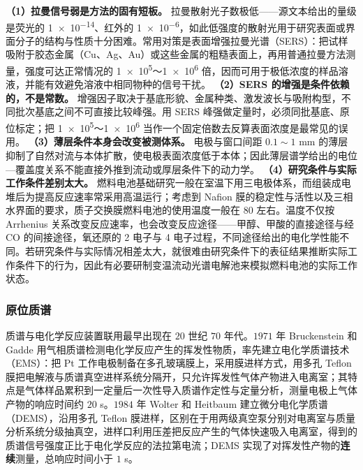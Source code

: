 \begin{pitfall}
 \textbf{（1）拉曼信号弱是方法的固有短板。} 拉曼散射光子数极低——源文本给出的量级是荧光的 \num{1e-14}、红外的 \num{1e-6}，如此低强度的散射光用于研究表面或界面分子的结构与性质十分困难。常用对策是表面增强拉曼光谱（SERS）：把试样吸附于胶态金属（Cu、Ag、Au）或这些金属的粗糙表面上，再用普通拉曼方法测量，强度可达正常情况的 \num{1e5}～\num{1e6} 倍，因而可用于极低浓度的样品溶液，并能有效避免溶液中相同物种的信号干扰。
 \textbf{（2）SERS 的增强是条件依赖的，不是常数。} 增强因子取决于基底形貌、金属种类、激发波长与吸附构型，不同批次基底之间不可直接比较峰强。用 SERS 峰强做定量时，必须同批基底、原位标定；把 \num{1e5}～\num{1e6} 当作一个固定倍数去反算表面浓度是最常见的误用。
 \textbf{（3）薄层条件本身会改变被测体系。} 电极与窗口间距 $0.1\sim1$ mm 的薄层抑制了自然对流与本体扩散，使电极表面浓度低于本体；因此薄层谱学给出的电位—覆盖度关系不能直接外推到流动或厚层条件下的动力学。
 \textbf{（4）研究条件与实际工作条件差别太大。} 燃料电池基础研究一般在室温下用三电极体系，而组装成电堆后为提高反应速率常采用高温运行；考虑到 Nafion 膜的稳定性与活性以及三相水界面的要求，质子交换膜燃料电池的使用温度一般在 $80$ \degC 左右。温度不仅按 Arrhenius 关系改变反应速率，也会改变反应途径——甲醇、甲酸的直接途径与经 CO 的间接途径，氧还原的 2 电子与 4 电子过程，不同途径给出的电化学性能不同。若研究条件与实际情况相差太大，就很难由研究条件下的表征结果推断实际工作条件下的行为，因此有必要研制变温流动光谱电解池来模拟燃料电池的实际工作状态。
\end{pitfall}

\subsubsection{原位质谱}

质谱与电化学反应装置联用最早出现在 $20$ 世纪 $70$ 年代。$1971$ 年 Bruckenstein 和 Gadde 用气相质谱检测电化学反应产生的挥发性物质，率先建立电化学质谱技术（EMS）：把 Pt 工作电极制备在多孔玻璃膜上，采用膜进样方式，用多孔 Teflon 膜把电解液与质谱真空进样系统分隔开，只允许挥发性气体产物进入电离室；其特点是气体样品累积到一定量后一次性导入质谱作定性与定量分析，测量电极上气体产物的响应时间约 $20$ s。$1984$ 年 Wolter 和 Heitbaum 建立微分电化学质谱（DEMS），沿用多孔 Teflon 膜进样，区别在于用两级真空泵分别对电离室与质量分析系统分级抽真空，进样口利用压差把反应产生的气体快速吸入电离室，得到的质谱信号强度正比于电化学反应的法拉第电流；DEMS 实现了对挥发性产物的\textbf{连续}测量，总响应时间小于 $1$ s。

